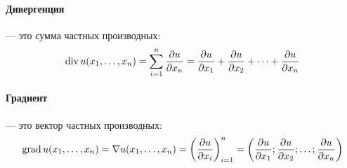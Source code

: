 \paragraph{Дивергенция}
--- это сумма частных производных:
$$
	\operatorname{div} u(x_1, \dots, x_n) =
	\sum_{i=1}^n \frac{\partial u}{\partial x_n} =
	\frac{\partial u}{\partial x_1} + \frac{\partial u}{\partial x_2} +
	\dots + \frac{\partial u}{\partial x_n}
$$

\paragraph{Градиент}
--- это вектор частных производных:
$$
	\operatorname{grad} u(x_1, \dots, x_n) =
	\nabla u(x_1, \dots, x_n) =
	\left( \frac{\partial u}{\partial x_i}\right)_{i=1}^{n} =
	\left( \frac{\partial u}{\partial x_1} ; \frac{\partial u}{\partial x_2} ;
	\dots; \frac{\partial u}{\partial x_n}\right)
$$

